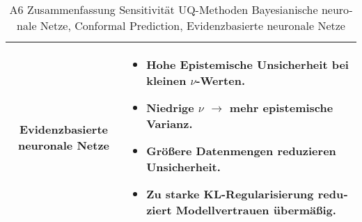\begin{otherlanguage}{ngerman}
\begin{table}[!htbp]
\begin{tabularx}{\textwidth}{|c|X|}
\multirow{6}{*}{\centering \textbf{\gls{Evidenzbasierte neuronale Netze}}} &
\begin{itemize}[topsep=0em, itemsep=0em, leftmargin=*, label={}]
    \item Hohe \gls{Epistemische Unsicherheit} bei kleinen \(\nu\)-Werten.
    \item Niedrige \(\nu\) \(\rightarrow\) mehr epistemische Varianz.
    \item Größere Datenmengen reduzieren Unsicherheit.
    \item Zu starke KL-Regularisierung reduziert Modellvertrauen übermäßig.
\end{itemize}
\\
\hline

\end{tabularx}
\caption{A6 Zusammenfassung Sensitivität UQ-Methoden \gls{Bayesianische neuronale Netze}, \gls{Conformal Prediction}, \gls{Evidenzbasierte neuronale Netze}}
\label{tab:sensitivity_r9_transposed}
\end{table}





~\nocite{BostonHousing2013}
~\nocite{CombinedCyclePowerPlant2014}
~\nocite{ConcreteCompressiveStrength1998}
~\nocite{ConditionBasedMaintenanceOfNavalPropulsionPlants2014}
~\nocite{EnergyEfficiency2012}
~\nocite{Fisher1936}
~\nocite{Cortez2009}




~\nocite{DuckDBDevelopers.2024}
~\nocite{EdlPytorchDevelopers.2024}
~\nocite{LoguruDevelopers.2024}
~\nocite{MatplotlibDevelopers.2024}
~\nocite{NotebookDevelopers.2024}
~\nocite{NumpyDevelopers.2024}
~\nocite{OpenpyxlDevelopers.2024}
~\nocite{PandasDevelopers.2024}
~\nocite{ProperscoringDevelopers.2024}
~\nocite{PyroPplDevelopers.2024}
~\nocite{PytestDevelopers.2024}
~\nocite{RuffDevelopers.2024}
~\nocite{ScikitLearnDevelopers.2024}
~\nocite{ScipyDevelopers.2024}
~\nocite{SeabornDevelopers.2024}
~\nocite{SphinxDevelopers.2024}
~\nocite{TensorflowDevelopers.2024}
~\nocite{TorchDevelopers.2024}
~\nocite{TorchmetricsDevelopers.2024}
~\nocite{TorchvisionDevelopers.2024}
~\nocite{XlrdDevelopers.2024}




\end{otherlanguage}
